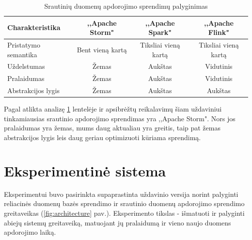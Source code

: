 \documentclass{VUMIFPSkursinis}
\begin{document}
\begin{table}[!htbp]
    \begin{center}
        \caption{Srautinių duomenų apdorojimo sprendimų palyginimas}
        \label{table:comparer}
        \begin{tabular}{ | l | c | c | c | } 
            \hline
            Charakteristika & ,,Apache Storm" & ,,Apache Spark" & ,,Apache Flink" \\* \hline
            Pristatymo semantika & Bent vieną kartą & Tiksliai vieną kartą & Tiksliai vieną kartą \\* \hline
            Uždelstumas & Žemas & Aukštas & Vidutinis \\* \hline
            Pralaidumas & Žemas & Aukštas & Vidutinis \\* \hline
            Abstrakcijos lygis & Žemas & Aukštas & Aukštas \\* \hline
        \end{tabular}
    \end{center}
\end{table}\par

Pagal atlikta analizę \ref{table:comparer} lentelėje ir apsibrėžtų reikalavimų šiam uždaviniui tinkamiausias srautinio apdorojimo sprendimas yra ,,Apache Storm". 
Nors jos pralaidumas yra žemas, mums daug aktualiau yra greitis, taip pat žemas abstrakcijos lygis leis daug geriau optimizuoti kūriama sprendimą. 

\section{Eksperimentinė sistema}

Eksperimentui buvo pasirinkta supaprastinta uždavinio versija norint palyginti reliacinės duomenų bazės sprendimo ir srautinio duomenų 
apdorojimo sprendimo greitaveikas (\ref{fig:architecture} pav.).
Eksperimento tikslas - išmatuoti ir palyginti abiejų sistemų greitaveiką, matuojant jų pralaidumą ir vieno naujo duomens apdorojimo laiką.
\end{document}
